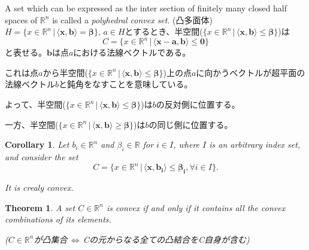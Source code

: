 \documentclass{jsarticle}
\newtheorem{thm}{Theorem}[section]
\newtheorem{cor}{Corollary} [thm]
\theoremstyle{definition}
\begin{document}
A set which can be expressed as the inter section of finitely
many closed half spaces of $\mathbb{R}^n$ is called a
\textit{polyhedral convex set}. (凸多面体)\\



$H = \{ x \in \mathbb{R}^n\,| \,\langle \bm{x}, \bm{b} \rangle =\bm{\beta } \} $,
$a \in H$とするとき、半空間($\{ x \in \mathbb{R}^n\,| \,\langle \bm{x},
\bm{b} \rangle \le \bm{\beta} \} $)は
\[
C = \{ x \in \mathbb{R}^n\,| \,\langle \bm{x - a}, \bm{b}
\rangle \le \bm{0} \}
\]
と表せる。$\bm{b}$は点$a$における法線ベクトルである。

これは点$a$から半空間($\{ x \in \mathbb{R}^n\,| \,\langle \bm{x}, \bm{b}
\rangle \le \bm{\beta} \}
$)上の点$a$に向かうベクトルが超平面の法線ベクトル$b$と鈍角をなすことを意味している。

よって、半空間($\{ x \in \mathbb{R}^n\,| \,\langle \bm{x}, \bm{b}
\rangle \le \bm{\beta} \} $)は$b$の反対側に位置する。

一方、半空間($\{ x \in \mathbb{R}^n\,| \,\langle \bm{x}, \bm{b}
\rangle \ge \bm{\beta} \} $)は$b$の同じ側に位置する。\\



\begin{cor}
Let $b_i \in \mathbb{R}^n$ and  $\beta_i \in \mathbb{R}$ for $i \in I$, where $I$ is an arbitrary index set, and consider the set 
\[
C = \{ x \in \mathbb{R}^n\,| \,\langle \bm{x}, \bm{b_i}
\rangle \le \bm{\beta_i}, \forall i \in I \}.
\]

It is crealy convex.\\
\end{cor}

\begin{thm}
A set $C \in \mathbb{R}^n$ is convex if and only if it contains all the convex combinations of its elements.

($C \in \mathbb{R}^n$が凸集合$\, \Longleftrightarrow \, $Cの元からなる全ての凸結合をC自身が含む)\\　
\end{thm}
\end{document}
